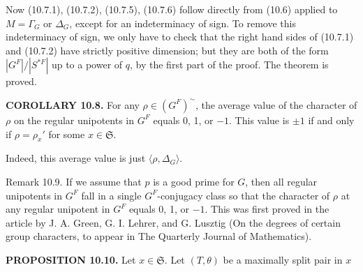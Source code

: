 \documentclass[9pt,twoside]{extarticle}
\begin{document}
{Now (10.7.1), (10.7.2), (10.7.5), (10.7.6) follow directly from (10.6) applied to \(M=\Gamma_G\) or \(\Delta_G\), except for an indeterminacy of sign. To remove this indeterminacy of sign, we only have to check that the right hand sides of (10.7.1) and (10.7.2) have strictly positive dimension; but they are both of the form \(|G^F|/|S^{*F}|\) up to a power of \(q\), by the first part of the proof. The theorem is proved.\par

\noindent\textbf{COROLLARY 10.8.} For any \(\rho\in(G^F)^{\sim}\), the average value of the character of \(\rho\) on the regular unipotents in \(G^F\) equals 0, 1, or \(-1\). This value is \(\pm1\) if and only if \(\rho=\rho_x'\) for some \(x\in\mathfrak S\).\par

Indeed, this average value is just \(\langle\rho,\Delta_G\rangle\).\par

Remark 10.9. If we assume that \(p\) is a good prime for \(G\), then all regular unipotents in \(G^F\) fall in a single \(G^F\)-conjugacy class so that the character of \(\rho\) at any regular unipotent in \(G^F\) equals 0, 1, or \(-1\). This was first proved in the article by J. A. Green, G. I. Lehrer, and G. Lusztig (On the degrees of certain group characters, to appear in The Quarterly Journal of Mathematics).\par

\noindent\textbf{PROPOSITION 10.10.} Let \(x\in\mathfrak S\). Let \((T,\theta)\) be a maximally split pair in \(x\)\par
}
\end{document}
